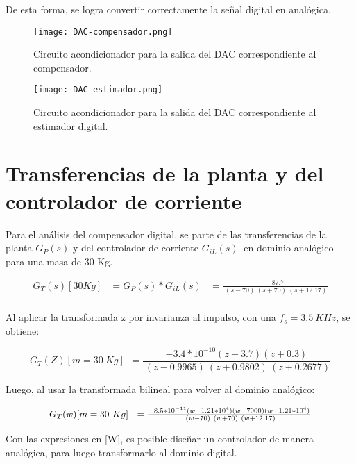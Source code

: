 \noindent De esta forma, se logra convertir correctamente la señal digital en analógica.


\begin{figure}[H]
	\centering
	\texttt{[image: DAC-compensador.png]}
	\caption{Circuito acondicionador para la salida del DAC correspondiente al compensador.}
	\label{fig:DAC-compensador}
\end{figure}

\begin{figure}[H]
	\centering
	\texttt{[image: DAC-estimador.png]}
	\caption{Circuito acondicionador para la salida del DAC correspondiente al estimador digital.}
	\label{fig:DAC-estimador}
\end{figure}

\section{Transferencias de la planta y del controlador de corriente}

\noindent Para el an\'{a}lisis del compensador digital, se parte de las transferencias de la planta $G_P(s)$ y del controlador de corriente $G_{iL}(s)\ $ en dominio anal\'{o}gico para una masa de 30 Kg.

\begin{equation} 
	\begin{aligned}
	G_T(s)[30Kg]&=G_P(s)*G_{iL}(s)&=\frac{-87.7}{\ (s-70)\ (s+70)\ (s+12.17)}\\
	\end{aligned}
\end{equation}

\noindent Al aplicar la transformada z por invarianza al impulso, con una $f_s=3.5\ KHz$, se obtiene:

\begin{equation} 
	G_T(Z)[m=30\ Kg]\ \ =\frac{-3.4*10^{-10}(z+3.7)(z+0.3)}{\ (z-0.9965)\ (z+0.9802)\ (z+0.2677)}
\end{equation}

\noindent Luego, al usar la transformada bilineal para volver al dominio anal\'{o}gico:

\begin{equation}
	\resizebox{.8\hsize}{!}
	{
	$G_T(w)[m=30\ Kg]\ \ =\frac{-8.5*10^{-11}(w-1.21*10^4)(w-7000)(w+1.21*10^4)}{\ (w-70)\ (w+70)\ (w+12.17)}$
	}
\end{equation}


\noindent Con las expresiones en [W], es posible dise\~{n}ar un controlador de manera anal\'{o}gica, para luego transformarlo al dominio digital.


